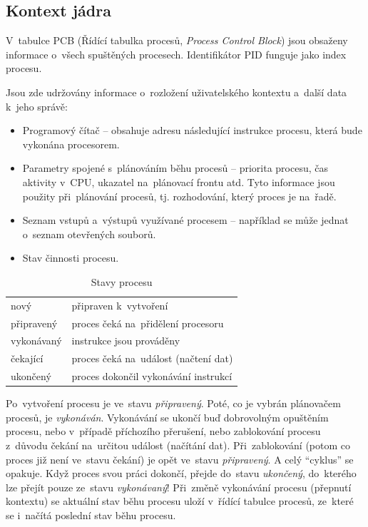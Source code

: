 \subsection{Kontext jádra}

V~tabulce PCB (Řídící tabulka procesů, \emph{Process Control Block}) jsou obsaženy informace o~všech spuštěných procesech. Identifikátor PID funguje jako index procesu.

Jsou zde udržovány informace o~rozložení uživatelského kontextu a~další data k~jeho správě:

\begin{itemize}
	\item Programový čítač -- obsahuje adresu následující instrukce procesu, která bude vykonána procesorem.
	\item Parametry spojené s~plánováním běhu procesů -- priorita procesu, čas aktivity v~CPU, ukazatel na~plánovací frontu atd. Tyto informace jsou použity při~plánování procesů, tj. rozhodování, který proces je na~řadě.
	\item Seznam vstupů a~výstupů využívané procesem -- například se může jednat o~seznam otevřených souborů.
	\item Stav činnosti procesu.
\end{itemize}

\begin{table}[ht]
	\centering
	\begin{tabular}{l|l}
	nový       & připraven k~vytvoření \\
	připravený & proces čeká na~přidělení procesoru \\
	vykonávaný & instrukce jsou prováděny \\
	čekající   & proces čeká na~událost (načtení dat) \\
	ukončený   & proces dokončil vykonávání instrukcí \\
	\end{tabular}
	\caption{Stavy procesu}
\end{table}

Po~vytvoření procesu je ve~stavu \emph{připravený}. Poté, co je vybrán plánovačem procesů, je \emph{vykonáván}. Vykonávání se ukončí buď dobrovolným opuštěním procesu, nebo v~případě příchozího přerušení, nebo zablokování procesu z~důvodu čekání na~určitou událost (načítání dat). Při~zablokování (potom co proces již není ve~stavu čekání) je opět ve~stavu \emph{připravený}. A celý \enquote{cyklus} se opakuje. Když proces svou práci dokončí, přejde do~stavu \emph{ukončený}, do~kterého lze přejít pouze ze~stavu \emph{vykonávaný}! Při~změně vykonávání procesu (přepnutí kontextu) se aktuální stav běhu procesu uloží v~řídící tabulce procesů, ze~které se i~načítá poslední stav běhu procesu.

